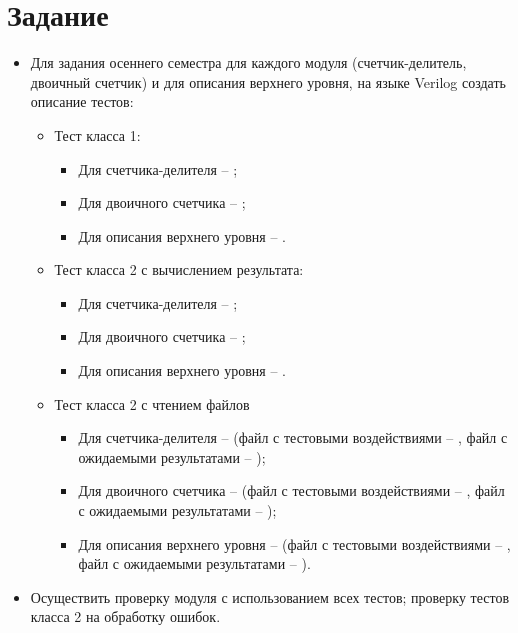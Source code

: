 





\tableofcontents
\lstlistoflistings
\newpage

\section{Задание}

\begin{itemize}
	\item Для задания  осеннего семестра для каждого модуля (счетчик-делитель, двоичный счетчик) и для описания верхнего уровня, на языке Verilog создать описание тестов:
		\begin{itemize}
			\item Тест класса 1:
				\begin{itemize}
					\item Для счетчика-делителя -- ;
					\item Для двоичного счетчика -- ;
					\item Для описания верхнего уровня -- .
				\end{itemize}
			\item Тест класса 2 с вычислением результата:
				\begin{itemize}
					\item Для счетчика-делителя -- ;
					\item Для двоичного счетчика -- ;
					\item Для описания верхнего уровня -- .
				\end{itemize}
			\item Тест класса 2 с чтением файлов
				\begin{itemize}
					\item Для счетчика-делителя --  (файл с тестовыми воздействиями -- , файл с ожидаемыми результатами -- );
					\item Для двоичного счетчика --  (файл с тестовыми воздействиями -- , файл с ожидаемыми результатами -- );
					\item Для описания верхнего уровня --  (файл с тестовыми воздействиями -- , файл с ожидаемыми результатами -- ).
				\end{itemize}
		\end{itemize}

	\item Осуществить проверку модуля с использованием всех тестов; проверку тестов класса 2 на обработку ошибок.
\end{itemize}

